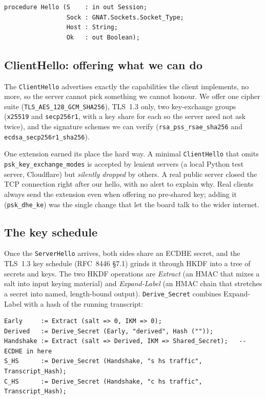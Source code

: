 \begin{lstlisting}
procedure Hello (S    : in out Session;
                 Sock : GNAT.Sockets.Socket_Type;
                 Host : String;
                 Ok   : out Boolean);
\end{lstlisting}

\subsection{ClientHello: offering what we can do}

The \texttt{ClientHello} advertises exactly the capabilities the client
implements, no more, so the server cannot pick something we cannot honour. We
offer one cipher suite (\texttt{TLS\_AES\_128\_GCM\_SHA256}), TLS~1.3 only, two
key-exchange groups (\texttt{x25519} and \texttt{secp256r1}, with a key share for
each so the server need not ask twice), and the signature schemes we can verify
(\texttt{rsa\_pss\_rsae\_sha256} and \texttt{ecdsa\_secp256r1\_sha256}).

One extension earned its place the hard way. A minimal \texttt{ClientHello} that
omits \texttt{psk\_key\_exchange\_modes} is accepted by lenient servers (a local
Python test server, Cloudflare) but \emph{silently dropped} by others. A real
public server closed the TCP connection right after our hello, with no alert to
explain why. Real clients always send the extension even when offering no
pre-shared key; adding it (\texttt{psk\_dhe\_ke}) was the single change that let
the board talk to the wider internet.

\subsection{The key schedule}

Once the \texttt{ServerHello} arrives, both sides share an ECDHE secret, and the
TLS~1.3 key schedule (RFC~8446 \S7.1) grinds it through HKDF into a tree of
secrets and keys. The two HKDF operations are \emph{Extract} (an HMAC that mixes a
salt into input keying material) and \emph{Expand-Label} (an HMAC chain that
stretches a secret into named, length-bound output). \texttt{Derive\_Secret}
combines Expand-Label with a hash of the running transcript:

\begin{lstlisting}
Early     := Extract (salt => 0, IKM => 0);
Derived   := Derive_Secret (Early, "derived", Hash (""));
Handshake := Extract (salt => Derived, IKM => Shared_Secret);   --  ECDHE in here
S_HS      := Derive_Secret (Handshake, "s hs traffic", Transcript_Hash);
C_HS      := Derive_Secret (Handshake, "c hs traffic", Transcript_Hash);
\end{lstlisting}

